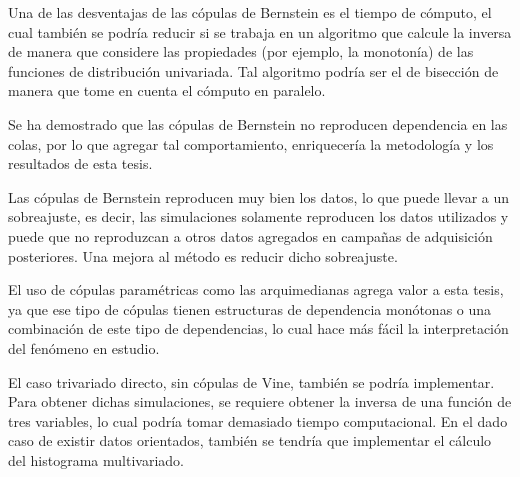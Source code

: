 Una de las desventajas de las c\'opulas de Bernstein es el tiempo de c\'omputo, el cual tambi\'en se podr\'ia reducir si se trabaja en un algoritmo que calcule la inversa de manera que considere las propiedades (por ejemplo, la monoton\'ia) de las funciones de distribuci\'on univariada. Tal algoritmo podr\'ia ser el de bisecci\'on de manera que tome en cuenta el c\'omputo en paralelo.

Se ha demostrado que las c\'opulas de Bernstein no reproducen dependencia en las colas, por lo que agregar tal comportamiento, enriquecer\'ia la metodolog\'ia y los resultados de esta tesis.

Las c\'opulas de Bernstein reproducen muy bien los datos, lo que puede llevar a un sobreajuste, es decir, las simulaciones solamente reproducen los datos utilizados y puede que no reproduzcan a otros datos agregados en campa\~nas de adquisici\'on posteriores.
Una mejora al m\'etodo es reducir dicho sobreajuste.

El uso de c\'opulas param\'etricas como las arquimedianas agrega valor a esta tesis, ya que ese tipo de c\'opulas tienen estructuras de dependencia mon\'otonas o una combinaci\'on de este tipo de dependencias, lo cual hace m\'as f\'acil la interpretaci\'on del fen\'omeno en estudio.

El caso trivariado directo, sin c\'opulas de Vine, tambi\'en se podr\'ia implementar. Para obtener dichas simulaciones, se requiere obtener la inversa de una funci\'on de tres variables, lo cual podr\'ia tomar demasiado tiempo computacional. En el dado caso de existir datos orientados, tambi\'en se tendr\'ia que implementar el c\'alculo del histograma multivariado.


